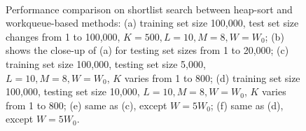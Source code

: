 \begin{figure}[t]
    \\
\caption[Performance comparison between heap-sort and workqueue-based methods used in Bi-level LSH shortlist search]{\label{fig:6:res:workqueuecomp} Performance comparison on shortlist search between heap-sort and workqueue-based methods: (a) training set size 100,000, test set size changes from 1 to 100,000, $K=500, L=10, M=8, W=W_0$; (b) shows the close-up of (a) for testing set sizes from 1 to 20,000; (c) training set size 100,000, testing set size 5,000, $L=10, M=8, W=W_0$, $K$ varies from 1 to 800; (d) training set size 100,000, testing set size 10,000, $L=10, M=8, W=W_0$, $K$ varies from 1 to 800; (e) same as (c), except $W = 5W_0$; (f) same as (d), except $W = 5W_0$.}
\end{figure}
